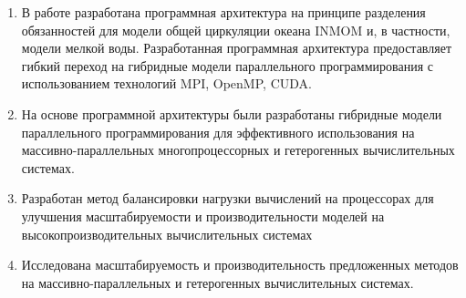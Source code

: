 
\begin{enumerate}
\item В работе разработана программная архитектура на принципе разделения обязанностей для модели общей циркуляции океана INMOM и, в частности,  модели мелкой воды. Разработанная программная архитектура предоставляет гибкий переход на гибридные модели параллельного программирования с использованием технологий MPI, OpenMP, CUDA.
\item На основе программной архитектуры были разработаны гибридные модели параллельного программирования для эффективного использования на массивно-параллельных многопроцессорных и гетерогенных вычислительных системах.
\item Разработан метод балансировки нагрузки вычислений на процессорах для улучшения масштабируемости и производительности моделей на высокопроизводительных вычислительных системах
\item Исследована масштабируемость и производительность предложенных методов на массивно-параллельных и гетерогенных вычислительных системах.
\end{enumerate}